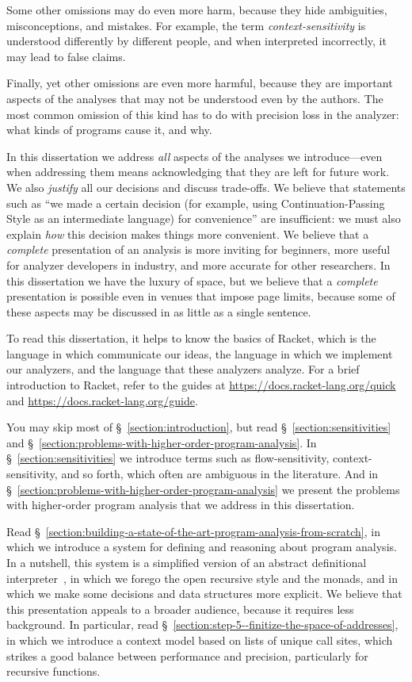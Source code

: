 \documentclass[12pt, oneside]{book}
\begin{document}
Some other omissions may do even more harm, because they hide ambiguities, misconceptions, and mistakes. For example, the term \emph{context-sensitivity} is understood differently by different people, and when interpreted incorrectly, it may lead to false claims.

Finally, yet other omissions are even more harmful, because they are important aspects of the analyses that may not be understood even by the authors. The most common omission of this kind has to do with precision loss in the analyzer: what kinds of programs cause it, and why.

In this dissertation we address \emph{all} aspects of the analyses we introduce—even when addressing them means acknowledging that they are left for future work. We also \emph{justify} all our decisions and discuss trade-offs. We believe that statements such as “we made a certain decision (for example, using Continuation-Passing Style as an intermediate language) for convenience” are insufficient: we must also explain \emph{how} this decision makes things more convenient. We believe that a \emph{complete} presentation of an analysis is more inviting for beginners, more useful for analyzer developers in industry, and more accurate for other researchers. In this dissertation we have the luxury of space, but we believe that a \emph{complete} presentation is possible even in venues that impose page limits, because some of these aspects may be discussed in as little as a single sentence.

To read this dissertation, it helps to know the basics of Racket, which is the language in which communicate our ideas, the language in which we implement our analyzers, and the language that these analyzers analyze. For a brief introduction to Racket, refer to the guides at \url{https://docs.racket-lang.org/quick} and \url{https://docs.racket-lang.org/guide}.

You may skip most of §~\ref{section:introduction}, but read §~\ref{section:sensitivities} and §~\ref{section:problems-with-higher-order-program-analysis}. In §~\ref{section:sensitivities} we introduce terms such as flow-sensitivity, context-sensitivity, and so forth, which often are ambiguous in the literature. And in §~\ref{section:problems-with-higher-order-program-analysis} we present the problems with higher-order program analysis that we address in this dissertation.

Read §~\ref{section:building-a-state-of-the-art-program-analysis-from-scratch}, in which we introduce a system for defining and reasoning about program analysis. In a nutshell, this system is a simplified version of an abstract definitional interpreter~\cite{adi}, in which we forego the open recursive style and the monads, and in which we make some decisions and data structures more explicit. We believe that this presentation appeals to a broader audience, because it requires less background. In particular, read §~\ref{section:step-5--finitize-the-space-of-addresses}, in which we introduce a context model based on lists of unique call sites, which strikes a good balance between performance and precision, particularly for recursive functions.
\end{document}

